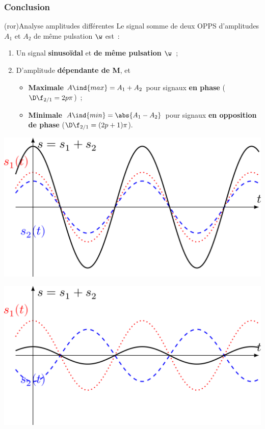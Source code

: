 \documentclass[../../main/main.tex]{subfiles}
\begin{document}
\subsubsection{Conclusion}
\begin{tcb}(ror){Analyse amplitudes différentes}
	Le signal somme de deux OPPS d'amplitudes $A_1$ et $A_2$ de même pulsation
	$\w$ est~:
	\begin{enumerate}
		\item Un signal \textbf{sinusoïdal} et \textbf{de même pulsation
			      $\mathbf{\w}$}~;
		\item D'amplitude \textbf{dépendante de M}, et
		      \begin{itemize}
			      \item \textbf{Maximale} $A\ind{max} = A_1 + A_2$ pour signaux
			            \textbf{en phase} ($\D\f_{2/1} = 2p\pi$)~;
			      \item \textbf{Minimale} $A\ind{min} = \abs{A_1 - A_2}$ pour signaux
			            \textbf{en opposition de phase} ($\D\f_{2/1} = (2p+1)\pi$).
		      \end{itemize}
	\end{enumerate}
	\begin{isd}
		\begin{center}
			\includegraphics[width=\linewidth]{somme_0}
			\label{fig:sommephase}
		\end{center}
		\tcblower
		\begin{center}
			\includegraphics[width=\linewidth]{somme_pi}
			\label{fig:sommeopp}
		\end{center}
	\end{isd}
\end{tcb}
\end{document}
